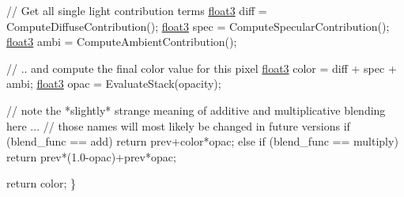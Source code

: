 \begin{DoxyCode}
  \textcolor{comment}{// Get all single light contribution terms}
  \hyperlink{structfloat3}{float3} diff = ComputeDiffuseContribution();
  \hyperlink{structfloat3}{float3} spec = ComputeSpecularContribution(); 
  \hyperlink{structfloat3}{float3} ambi = ComputeAmbientContribution();

  \textcolor{comment}{// .. and compute the final color value for this pixel}
  \hyperlink{structfloat3}{float3} color = diff + spec + ambi;
  \hyperlink{structfloat3}{float3} opac  = EvaluateStack(opacity);

  \textcolor{comment}{// note the *slightly* strange meaning of additive and multiplicative blending here ...}
  \textcolor{comment}{// those names will most likely be changed in future versions}
  \textcolor{keywordflow}{if} (blend\_func == add)
       \textcolor{keywordflow}{return} prev+color*opac;
  \textcolor{keywordflow}{else} \textcolor{keywordflow}{if} (blend\_func == multiply)
       \textcolor{keywordflow}{return} prev*(1.0-opac)+prev*opac;

   \textcolor{keywordflow}{return} color;
\}
\end{DoxyCode}
 